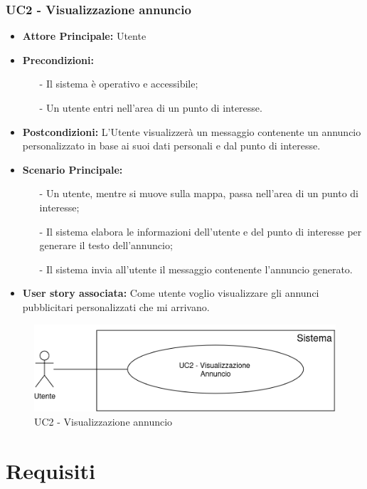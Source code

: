 \documentclass[11pt]{article}
\begin{document}
\begin{justify}
\subsubsection{\textbf{UC2 - Visualizzazione annuncio}}
\begin{itemize}
	\item \textbf{Attore Principale:} Utente
    \item \textbf{Precondizioni:} 
    	\begin{itemize}
    		\item [-] Il sistema è operativo e accessibile;
    		\item [-] Un utente entri nell'area di un punto di interesse.
    	\end{itemize}
    \item \textbf{Postcondizioni:} L'Utente visualizzerà un messaggio contenente un annuncio personalizzato in base ai suoi dati personali e dal punto di interesse.
    \item \textbf{Scenario Principale:} 
    \begin{itemize}
    		\item [-] Un utente, mentre si muove sulla mappa, passa nell'area di un punto di interesse;
    		\item [-] Il sistema elabora le informazioni dell'utente e del punto di interesse per generare il testo dell'annuncio;
    		\item [-] Il sistema invia all'utente il messaggio contenente l'annuncio generato.
	\end{itemize}
    \item \textbf{User story associata:} Come utente voglio visualizzare gli annunci pubblicitari personalizzati che mi arrivano.
\end{itemize}
\begin{figure}[ht]
    \centering
    \includegraphics[width=0.5\linewidth]{UC2image.png}
    \caption{UC2 - Visualizzazione annuncio}
    \label{fig:UC2}
\end{figure}


\newpage
\section{Requisiti}


\end{justify}
\end{document}
